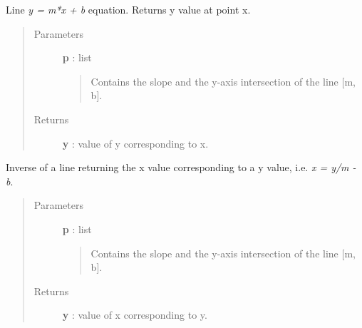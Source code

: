 \documentclass[a4paper,10pt,english]{sphinxmanual}
\begin{document}

\begin{fulllineitems}
\label{functions:astrolyze.functions.astro_functions.line}
Line \emph{y = m*x + b} equation. Returns y value at point x.
\begin{quote}\begin{description}
\item[{Parameters }] \leavevmode
\textbf{p} : list
\begin{quote}

Contains the slope and the y-axis intersection of the line {[}m, b{]}.
\end{quote}

\item[{Returns }] \leavevmode
\textbf{y} : value of y corresponding to x.

\end{description}\end{quote}

\end{fulllineitems}


\begin{fulllineitems}
\label{functions:astrolyze.functions.astro_functions.anti_line}
Inverse of a line returning the x value corresponding to a y value, i.e.
\emph{x = y/m - b}.
\begin{quote}\begin{description}
\item[{Parameters }] \leavevmode
\textbf{p} : list
\begin{quote}

Contains the slope and the y-axis intersection of the line {[}m, b{]}.
\end{quote}

\item[{Returns }] \leavevmode
\textbf{y} : value of x corresponding to y.

\end{description}\end{quote}

\end{fulllineitems}

\end{document}
